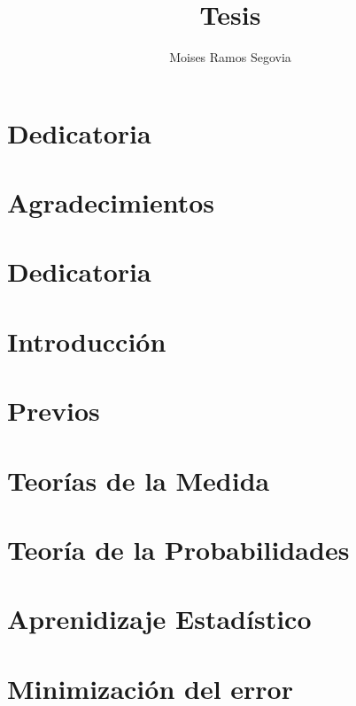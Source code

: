 \documentclass[12pt,a4paper,openany]{book}
\author{Moises Ramos Segovia}
\title{Tesis}
\begin{document}
	
	
	\chapter*{Dedicatoria}
		\begin{flushright}
			\textit{\lipsum[2]}
		\end{flushright}	

	\chapter*{Agradecimientos}
	\lipsum[1]
	
	\chapter*{Dedicatoria}
	\lipsum[1]
	
	\chapter{Introducción}
		
	
	\chapter{Previos}
		
	
	\chapter{Teorías de la Medida}
	\lipsum \lipsum[2]
	
	\chapter{Teoría de la Probabilidades}
	\lipsum[5] \lipsum[4]
	
	\chapter{Aprenidizaje Estadístico}
	\lipsum \lipsum[1]
	
	\chapter{Minimización del error}
	\lipsum \lipsum[3]
	
\end{document}
